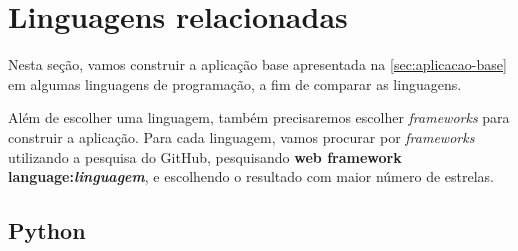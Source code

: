 \begin{table}[htb]
    \caption[\textit{Endpoints} da aplicação base]{\textit{Endpoints} da aplicação base}
    \label{tab-base-endpoints}
\end{table}

\section{Linguagens relacionadas}

Nesta seção, vamos construir a aplicação base apresentada na \autoref{sec:aplicacao-base}
em algumas linguagens de programação, a fim de comparar as linguagens.

Além de escolher uma linguagem, também precisaremos escolher \textit{frameworks}
para construir a aplicação. Para cada linguagem, vamos procurar por \textit{frameworks}
utilizando a pesquisa do GitHub, pesquisando \textbf{web framework language:\textit{linguagem}},
e escolhendo o resultado com maior número de estrelas.

\subsection{Python}

